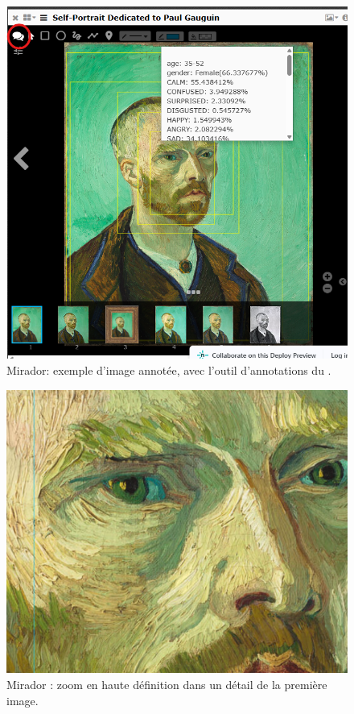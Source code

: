         \begin{figure}[h!]
            \centering
            \includegraphics[width=12cm]{02_images/part_01/12_mirador_02.png}
            \caption{Mirador: exemple d'image annotée, avec l'outil d'annotations du .}
        \end{figure}

        \begin{figure}[h!]
            \centering
            \includegraphics[width=12cm]{02_images/part_01/13_mirador_03.png}
            \caption{Mirador : zoom en haute définition dans un détail de la première image.}
        \end{figure}
    
